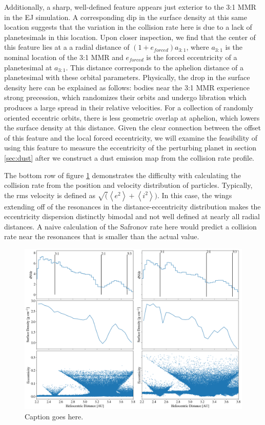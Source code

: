 \documentclass[onecolumn]{aastex63}
\begin{document}
Additionally, a sharp, well-defined feature appears just exterior to the 3:1 MMR in the EJ simulation. A corresponding dip in the surface density at this same location suggests that the variation in the collision rate here is due to a lack of planetesimals in this location. Upon closer inspection, we find that the center of this feature lies at a a radial distance of $(1+e_{forced})a_{3:1}$, where $a_{3:1}$ is the nominal location of the 3:1 MMR and $e_{forced}$ is the forced eccentricity of a planetesimal at $a_{3:1}$. This distance corresponds to the aphelion distance of a planetesimal with these orbital parameters. Physically, the drop in the surface density here can be explained as follows: bodies near the 3:1 MMR experience strong precession, which randomizes their orbits and undergo libration which produces a large spread in their relative velocities. For a collection of randomly oriented eccentric orbits, there is less geometric overlap at aphelion, which lowers the surface density at this distance. Given the clear connection between the offset of this feature and the local forced eccentricity, we will examine the feasibility of using this feature to measure the eccentricity of the perturbing planet in section \ref{sec:dust} after we construct a dust emission map from the collision rate profile.

The bottom row of figure \ref{fig:coll_hist_r} demonstrates the difficulty with calculating the collision rate from the position and velocity distribution of particles. Typically, the rms velocity is defined as $\sqrt(\left<e^2\right> + \left<i^2\right>)$. In this case, the wings extending off of the resonances in the distance-eccentricity distribution makes the eccentricity dispersion distinctly bimodal and not well defined at nearly all radial distances. A naive calculation of the Safronov rate here would predict a collision rate near the resonances that is smaller than the actual value.

\begin{figure}
    \includegraphics[width=\textwidth]{figures/coll_hist_r.png}
    \caption{Caption goes here.\label{fig:coll_hist_r}}
\end{figure}
\end{document}
